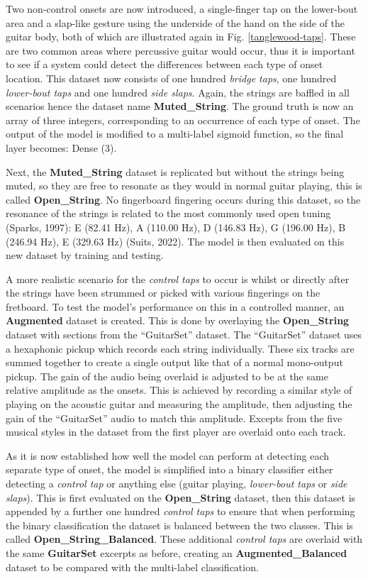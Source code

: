 \documentclass[conference]{IEEEtran}
\begin{document}
Two non-control onsets are now introduced, a single-finger tap on the lower-bout area and a slap-like gesture using the underside of the hand on the side of the guitar body, both of which are illustrated again in Fig. \ref{tanglewood-taps}. These are two common areas where percussive guitar would occur, thus
it is important to see if a system could detect the differences between each type of onset location. This dataset now consists of one hundred \emph{bridge taps}, one hundred \emph{lower-bout taps} and one hundred \emph{side slaps}. Again, the strings are baffled in all scenarios hence the dataset name \textbf{Muted\_String}.
The ground truth is now an array of three integers, corresponding to an occurrence of each type of onset. The output of the model is modified to a multi-label sigmoid function, so the final layer becomes: Dense (3). 

Next, the \textbf{Muted\_String} dataset is replicated but without the strings being muted, so they are free to resonate as they would in normal guitar playing, this is called \textbf{Open\_String}. No fingerboard fingering occurs during this dataset, so the resonance of the strings is related 
to the most commonly used open tuning (Sparks, 1997): E (82.41 Hz), A (110.00 Hz), D (146.83 Hz), G (196.00 Hz), B (246.94 Hz), E (329.63 Hz) (Suits, 2022). The model is then evaluated on this new dataset by training and testing.

A more realistic scenario for the \emph{control taps} to occur is whilst or directly after the strings have been strummed or picked with various fingerings on the fretboard. To test the model's performance on this in a controlled manner, an \textbf{Augmented} dataset is created. 
This is done by overlaying the \textbf{Open\_String} dataset with sections from the ``GuitarSet'' dataset. The ``GuitarSet'' dataset uses a hexaphonic pickup which records each string individually. These six tracks are summed together
to create a single output like that of a normal mono-output pickup. The gain of the audio being overlaid is adjusted to be at the same relative amplitude as the onsets. This is achieved by recording a similar style of playing on the acoustic guitar and measuring the amplitude, then adjusting
the gain of the ``GuitarSet'' audio to match this amplitude. Excepts from the five musical styles in the dataset from the first player are overlaid onto each track. 

As it is now established how well the model can perform at detecting each separate type of onset, the model is simplified into a binary classifier either detecting a \emph{control tap} or anything else (guitar playing, \emph{lower-bout taps} or \emph{side slaps}). 
This is first evaluated on the \textbf{Open\_String} dataset, then this dataset is appended by a further one hundred \emph{control taps} to ensure that when performing the binary classification the dataset is balanced between the two classes. This is called \textbf{Open\_String\_Balanced}. 
These additional \emph{control taps} are overlaid with the same \textbf{GuitarSet} excerpts as before, creating an \textbf{Augmented\_Balanced} dataset to be compared with the multi-label classification.
\end{document}
